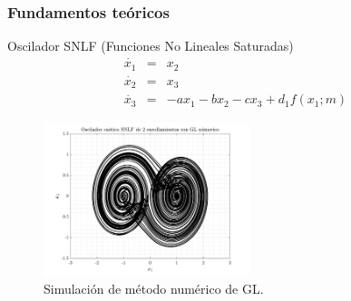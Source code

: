 \documentclass[10pt]{beamer}
\begin{document}
	\begin{frame}
		\frametitle{Fundamentos teóricos}
		\begin{block}{Oscilador SNLF (Funciones No Lineales Saturadas)}
		\justifying
		\begin{equation} 
		\begin{array}{lcl}
		\dot{x_{1}} & = & x_{2} \\
		\dot{x_{2}} & = & x_{3}\\
		\dot{x_{3}} & = & -a x_{1} - b x_{2} -c x_{3} + d_{1} f(x_{1};m)
		\end{array}
		\label{ec:oscilador}
	\end{equation}
		\end{block}
		
		\begin{figure}[hbtp]
			\centering
			\includegraphics[width = 6cm]{gl_num.pdf}
			\caption{ Simulación de método numérico de GL.}
		\end{figure}
	\end{frame}	
\end{document}
